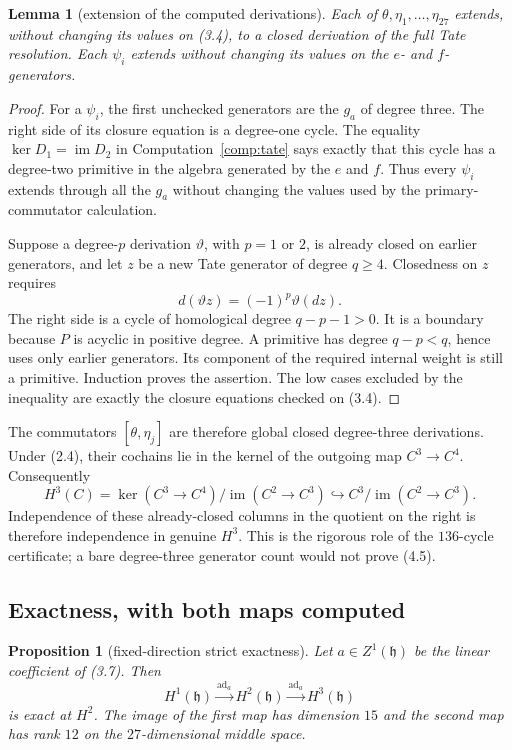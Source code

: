 \documentclass[11pt]{article}
\newtheorem{lemma}[theorem]{Lemma}
\newtheorem{proposition}[theorem]{Proposition}
\theoremstyle{definition}
\theoremstyle{remark}
\newcommand{\im}{\operatorname{im}}
\newcommand{\ad}{\operatorname{ad}}
\begin{document}
\begin{lemma}[extension of the computed derivations]\label{lem:derextend}
Each of $\theta,\eta_1,\ldots,\eta_{27}$ extends, without changing its values
on (3.4), to a closed derivation of the full Tate resolution.  Each
$\psi_i$ extends without changing its values on the $e$- and $f$-generators.
\end{lemma}

\begin{proof}
For a $\psi_i$, the first unchecked generators are the $g_a$ of degree three.
The right side of its closure equation is a degree-one cycle.  The equality
$\ker D_1=\im D_2$ in Computation~\ref{comp:tate} says exactly that this
cycle has a degree-two primitive in the algebra generated by the $e$ and
$f$.  Thus every $\psi_i$ extends through all the $g_a$ without changing the
values used by the primary-commutator calculation.

Suppose a degree-$p$ derivation $\vartheta$, with $p=1$ or $2$, is already
closed on earlier generators, and let $z$ be a new Tate generator of degree
$q\geq4$.  Closedness on $z$ requires
\[
 d(\vartheta z)=(-1)^p\vartheta(dz).                          \tag{4.4}
\]
The right side is a cycle of homological degree $q-p-1>0$.  It is a boundary
because $P$ is acyclic in positive degree.  A primitive has degree
$q-p<q$, hence uses only earlier generators.  Its component of the required
internal weight is still a primitive.  Induction proves the assertion.  The
low cases excluded by the inequality are exactly the closure equations
checked on (3.4).
\end{proof}

The commutators $[\theta,\eta_j]$ are therefore global closed degree-three
derivations.  Under (2.4), their cochains lie in the kernel of the outgoing
map $C^3\to C^4$.  Consequently
\[
 H^3(C)=\ker(C^3\to C^4)/\im(C^2\to C^3)
 \hookrightarrow C^3/\im(C^2\to C^3).                       \tag{4.5}
\]
Independence of these already-closed columns in the quotient on the right is
therefore independence in genuine $H^3$.  This is the rigorous role of the
$136$-cycle certificate; a bare degree-three generator count would not prove
(4.5).

\subsection{Exactness, with both maps computed}

\begin{proposition}[fixed-direction strict exactness]\label{prop:exact}
Let $a\in Z^1(\mathfrak h)$ be the linear coefficient of (3.7).  Then
\[
 H^1(\mathfrak h)\xrightarrow{\ad_a}H^2(\mathfrak h)
 \xrightarrow{\ad_a}H^3(\mathfrak h)                        \tag{4.6}
\]
is exact at $H^2$.  The image of the first map has dimension $15$ and the
second map has rank $12$ on the $27$-dimensional middle space.
\end{proposition}
\end{document}
